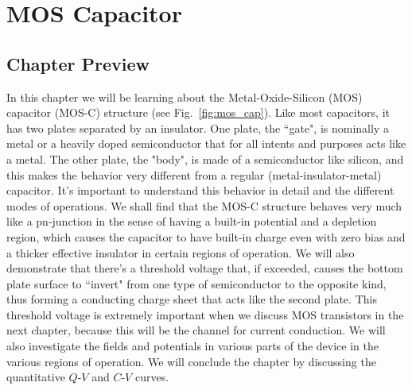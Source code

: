 \chapter{MOS Capacitor}
\label{ch:ch07_mos_c}
\graphicspath{{./figs_MOS_C/}}
\section{Chapter Preview}
In this chapter we will be learning about the Metal-Oxide-Silicon (MOS) capacitor (MOS-C) structure (see Fig.~\ref{fig:mos_cap}).  Like most capacitors, it has two plates separated by an insulator.  One plate, the ``gate",  is nominally a metal or a heavily doped semiconductor that for all intents and purposes acts like a metal.  The other plate, the "body",  is made of a semiconductor like silicon, and this makes the behavior very different from a regular (metal-insulator-metal) capacitor. It's important to understand this behavior in detail and the different modes of operations.   We shall find that the MOS-C structure behaves very much like a pn-junction in the sense of having a built-in potential and a depletion region, which causes the capacitor to have built-in charge even with zero bias and a thicker effective insulator in certain regions of operation.  We will also demonstrate that there's a threshold voltage that, if exceeded, causes the bottom plate surface to ``invert" from one type of semiconductor to the opposite kind, thus forming a conducting charge sheet that acts like the second plate.  This threshold voltage is extremely important when we discuss MOS transistors in the next chapter, because this will be the channel for current conduction.  We will also investigate the fields and potentials in various parts of the device in the various regions of operation.  We will conclude the chapter by discussing the quantitative  $Q$-$V$ and $C$-$V$ curves.
